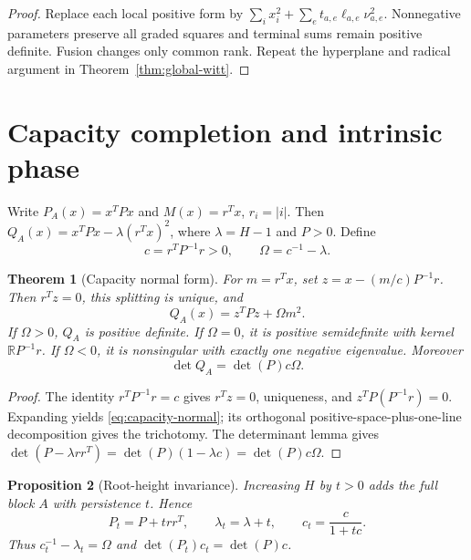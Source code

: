 \documentclass[11pt,a4paper]{amsart}
\theoremstyle{plain}
\newtheorem{theorem}{Theorem}[section]
\newtheorem{proposition}[theorem]{Proposition}
\theoremstyle{definition}
\newcommand{\RR}{\mathbb R}
\begin{document}
\begin{proof}
Replace each local positive form by
$\sum_i x_i^2+\sum_et_{a,e}\ell_{a,e}\nu_{a,e}^2$.  Nonnegative parameters preserve all graded
squares and terminal sums remain positive definite.  Fusion changes only common rank.  Repeat the
hyperplane and radical argument in Theorem~\ref{thm:global-witt}.
\end{proof}

\section{Capacity completion and intrinsic phase}\label{sec:capacity}

Write $P_A(x)=x^TPx$ and $M(x)=r^Tx$, $r_i=|i|$.  Then
$Q_A(x)=x^TPx-\lambda(r^Tx)^2$, where $\lambda=H-1$ and $P>0$.  Define
\begin{equation}\label{eq:capacity-data}
                         c=r^TP^{-1}r>0,\qquad \Omega=c^{-1}-\lambda.
\end{equation}

\begin{theorem}[Capacity normal form]\label{thm:capacity}
For $m=r^Tx$, set $z=x-(m/c)P^{-1}r$.  Then $r^Tz=0$, this splitting is unique, and
\begin{equation}\label{eq:capacity-normal}
                         \boxed{Q_A(x)=z^TPz+\Omega m^2.}
\end{equation}
If $\Omega>0$, $Q_A$ is positive definite.  If $\Omega=0$, it is positive semidefinite with
kernel $\RR P^{-1}r$.  If $\Omega<0$, it is nonsingular with exactly one negative eigenvalue.
Moreover
\begin{equation}\label{eq:determinant}
                         \det Q_A=\det(P)c\Omega.
\end{equation}
\end{theorem}

\begin{proof}
The identity $r^TP^{-1}r=c$ gives $r^Tz=0$, uniqueness, and
$z^TP(P^{-1}r)=0$.  Expanding yields \eqref{eq:capacity-normal}; its orthogonal
positive-space-plus-one-line decomposition gives the trichotomy.  The determinant lemma gives
$\det(P-\lambda rr^T)=\det(P)(1-\lambda c)=\det(P)c\Omega$.
\end{proof}

\begin{proposition}[Root-height invariance]\label{prop:root-invariance}
Increasing $H$ by $t>0$ adds the full block $A$ with persistence $t$.  Hence
\[
 P_t=P+trr^T,\qquad \lambda_t=\lambda+t,
 \qquad c_t=\frac{c}{1+tc}.
\]
Thus $c_t^{-1}-\lambda_t=\Omega$ and $\det(P_t)c_t=\det(P)c$.
\end{proposition}
\end{document}
